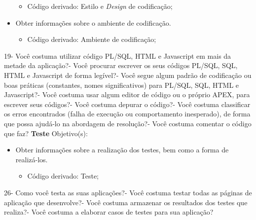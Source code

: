 \begin{anexosenv}
\begin{itemize}
\begin{itemize}
\item Código derivado: Estilo e \textit{Design} de codificação;
\end{itemize}
\item Obter informações sobre o ambiente de codificação.
\begin{itemize}
\item Código derivado: Ambiente de codificação;
\end{itemize}
\end{itemize}
    19- Você costuma utilizar código PL/SQL, HTML e Javascript em mais da metade da aplicação?- Você procurar escrever os seus códigos PL/SQL, SQL, HTML e Javascript de forma legível?- Você segue algum padrão de codificação ou boas práticas (constantes, nomes significativos) para PL/SQL, SQL, HTML e Javascript?- Você costuma usar algum editor de código ou o próprio APEX, para escrever seus códigos?- Você costuma depurar o código?- Você costuma classificar os erros encontrados (falha de execução ou comportamento inesperado), de forma que possa ajudá-lo na abordagem de resolução?- Você costuma comentar o código que faz?\newline
\newline\newline
\textbf{Teste}\newline\newline
Objetivo(s):
\begin{itemize}
\item Obter informações sobre a realização dos testes, bem como a forma de realizá-los.
\begin{itemize}
\item Código derivado: Teste;
\end{itemize}
\end{itemize}
    26- Como você testa as suas aplicações?- Você costuma testar todas as páginas de aplicação que desenvolve?- Você costuma armazenar os resultados dos testes que realiza?- Você costuma a elaborar casos de testes para sua aplicação?\newline

\end{anexosenv}
